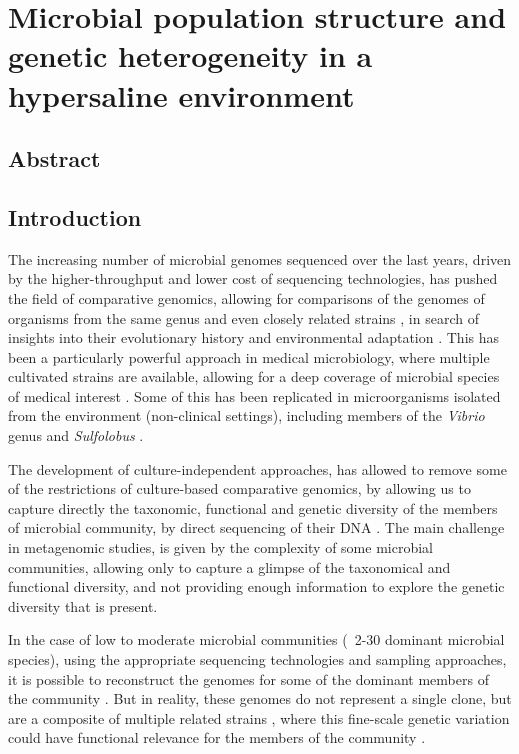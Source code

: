 \chapter{Microbial population structure and genetic heterogeneity in a hypersaline environment}

\section{Abstract}

\section{Introduction}

The increasing number of microbial genomes sequenced over the last years, driven by the higher-throughput and lower cost of sequencing technologies, has pushed the field of comparative genomics, allowing for comparisons of the genomes of organisms from the same genus and even closely related strains \cite{Fricke:2011gy,Doroghazi:2013gf,Grad:2013tc,Reno:2009bq}, in search of insights into their evolutionary history and environmental adaptation \cite{Reno:2009bq,ZhuofeiXu:2011fp}. This has been a particularly powerful approach in medical microbiology, where multiple cultivated strains are available, allowing for a deep coverage of microbial species of medical interest \cite{Feero:2011fr}. Some of this has been replicated in microorganisms isolated from the environment (non-clinical settings), including members of the \textit{Vibrio} genus \cite{Cordero:2012ik} and \textit{Sulfolobus} \cite{Reno:2009bq}.
 
The development of culture-independent approaches, has allowed to remove some of the restrictions of culture-based comparative genomics, by allowing us to capture directly the taxonomic, functional and genetic diversity of the members of microbial community, by direct sequencing of their DNA \cite{Bragg:2014kv}. The main challenge in metagenomic studies, is given by the complexity of some microbial communities, allowing only to capture a glimpse of the taxonomical and functional diversity, and not providing enough information to explore the genetic diversity that is present. 

In the case of low to moderate microbial communities (~2-30 dominant microbial species), using the appropriate sequencing technologies and sampling approaches, it is possible to reconstruct the genomes for some of the dominant members of the community \cite{Bragg:2014kv}. But in reality, these genomes do not represent a single clone, but are a composite of multiple related strains \cite{Podell:2013kx,Allen:2005dg}, where this fine-scale genetic variation could have functional relevance for the members of the community \cite{Lo:2007ht,Hemme:2010ds,Palenik:2009kx}.

